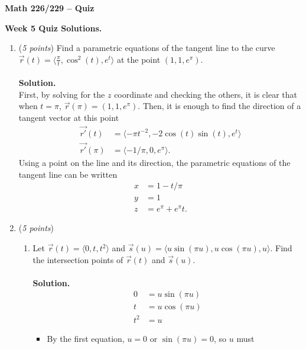 \documentclass[12 pt]{article}
\begin{document}
	\begin{center}
		\textbf{\hfill Math 226/229 -- Quiz} \\
	\end{center}
	\medskip

	\noindent
	\textbf{Week 5 Quiz Solutions.} \hfill
	\vspace{.1in}
	\hspace*{0.2in}
	\medskip
	\noindent
  \begin{enumerate}
    \item (\textit{5 points})
    Find a parametric equations of the tangent line to the curve
    $\vec r(t)=\langle\frac{\pi}{t}, \cos^{2}(t),e^t\rangle$ at the point
    $(1,1,e^\pi)$.
    \\~\\
    \textbf{Solution.}
    \\
    First, by solving for the $z$ coordinate and checking the others, it is
    clear that when $t = \pi$, $\vec r(\pi) = (1, 1, e^\pi)$.
    Then, it is enough to find the direction of a tangent vector at this point
    \begin{align*}
      \vec{r'}(t) &= \langle -\pi t^{-2}, -2\cos(t)\sin(t), e^t\rangle \\
      \vec{r'}(\pi) &= \langle -1/\pi, 0, e^\pi\rangle.
    \end{align*}
    Using a point on the line and its direction, the parametric equations
    of the tangent line can be written \begin{align*}
      x &= 1 - t/\pi \\
      y &= 1 \\
      z &= e^\pi + e^\pi t.
    \end{align*}
		\item (\textit{5 points})
		\begin{enumerate}
			\item Let $\vec{r}(t)=\langle0,t,t^2\rangle$ and
      $\vec{s}(u)=\langle u\sin(\pi u),u\cos(\pi u),u\rangle$.
      Find the intersection points of $\vec{r}(t)$ and $\vec{s}(u)$.
      \\~\\
      \textbf{Solution.}
      \begin{align}
        0   &= u\sin(\pi u) \\
        t   &= u\cos(\pi u) \\
        t^2 &= u
      \end{align}
      \begin{itemize}
        \item By the first equation, $u = 0$ or $\sin(\pi u) = 0$, so $u$ must

\end{itemize}
\end{enumerate}
\end{enumerate}
\end{document}
